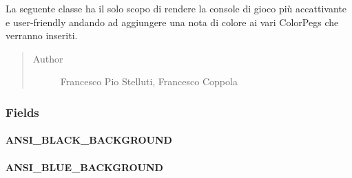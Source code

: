 \documentclass[letterpaper,10pt,italian,openany,oneside]{sphinxmanual}
\begin{document}
\begin{fulllineitems}
\label{\detokenize{source/it/unicam/cs/pa/mastermind/ui/AnsiUtility:it.unicam.cs.pa.mastermind.ui.AnsiUtility}}
La seguente classe ha il solo scopo di rendere la console di gioco più accattivante e user-friendly andando ad aggiungere una nota di colore ai vari ColorPegs che verranno inseriti.
\begin{quote}\begin{description}
\item[{Author}] \leavevmode
Francesco Pio Stelluti, Francesco Coppola

\end{description}\end{quote}

\end{fulllineitems}



\subsubsection{Fields}
\label{\detokenize{source/it/unicam/cs/pa/mastermind/ui/AnsiUtility:fields}}

\paragraph{ANSI\_BLACK\_BACKGROUND}
\label{\detokenize{source/it/unicam/cs/pa/mastermind/ui/AnsiUtility:ansi-black-background}}

\begin{fulllineitems}
\label{\detokenize{source/it/unicam/cs/pa/mastermind/ui/AnsiUtility:it.unicam.cs.pa.mastermind.ui.AnsiUtility.ANSI_BLACK_BACKGROUND}}
\end{fulllineitems}



\paragraph{ANSI\_BLUE\_BACKGROUND}
\label{\detokenize{source/it/unicam/cs/pa/mastermind/ui/AnsiUtility:ansi-blue-background}}
\end{document}
